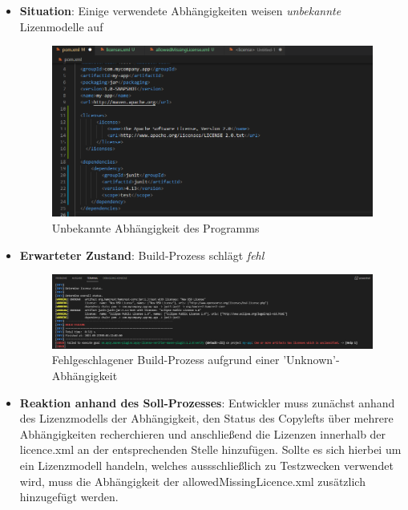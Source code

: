 \begin{itemize}
    \item \textbf{Situation}: Einige verwendete Abhängigkeiten weisen \textit{unbekannte} Lizenmodelle auf
    
    \begin{figure}[h]
        \centering
        \includegraphics[scale=0.5]{Bilder/Fall4Situation.png}
        \caption{Unbekannte Abhängigkeit des Programms}
    \end{figure}

    \item \textbf{Erwarteter Zustand}: Build-Prozess schlägt \textit{fehl} 
    
    \begin{figure}[h]
        \centering
        \includegraphics[scale=0.4]{Bilder/Fall4Zustand.png}
        \caption{Fehlgeschlagener Build-Prozess aufgrund einer 'Unknown'-Abhängigkeit}
    \end{figure}

    \item \textbf{Reaktion anhand des Soll-Prozesses}: Entwickler muss zunächst anhand des Lizenzmodells der Abhängigkeit, den Status des Copylefts über mehrere Abhängigkeiten recherchieren und anschließend die Lizenzen innerhalb der licence.xml an der entsprechenden Stelle hinzufügen. Sollte es sich hierbei um ein Lizenzmodell handeln, welches aussschließlich zu Testzwecken verwendet wird, muss die Abhängigkeit der allowedMissingLicence.xml zusätzlich hinzugefügt werden. 
\end{itemize}

